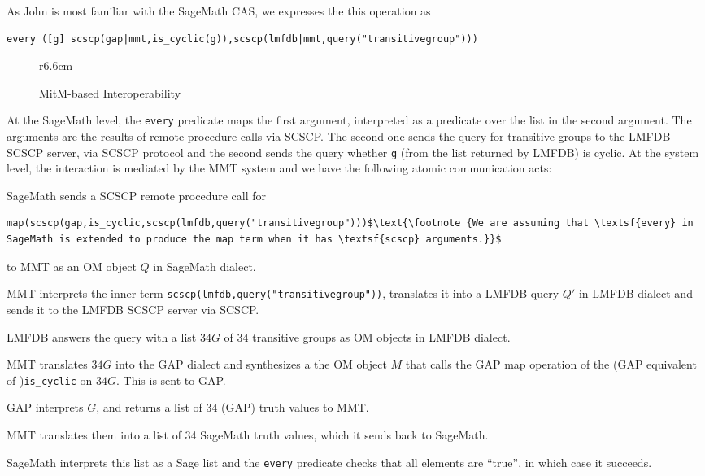 As John is most familiar with the SageMath CAS, we expresses the this operation as 
\begin{lstlisting}
every ([g] scscp(gap|mmt,is_cyclic(g)),scscp(lmfdb|mmt,query("transitivegroup"))) 
\end{lstlisting}

\begin{wrapfigure}r{6.6cm}\vspace*{-2em}
  \vspace*{-1em}
  \caption{MitM-based Interoperability}\label{fig:mitmcomm}\vspace*{-1em}
\end{wrapfigure}
At the SageMath level, the \lstinline|every| predicate maps the first argument, interpreted as a predicate over the list in the second argument. 
The arguments are the results of remote procedure calls via SCSCP. 
The second one sends the query for transitive groups to the LMFDB SCSCP server, via SCSCP protocol and the second sends the query whether \lstinline|g| (from the list returned by LMFDB) is cyclic.
At the system level, the interaction is mediated by the MMT system and we have the following atomic communication acts: 
\begin{compactenum}
\item SageMath sends a SCSCP remote procedure call for 
  \begin{lstlisting}[mathescape]
    map(scscp(gap,is_cyclic,scscp(lmfdb,query("transitivegroup")))$\text{\footnote {We are assuming that \textsf{every} in SageMath is extended to produce the map term when it has \textsf{scscp} arguments.}}$
\end{lstlisting}
  to MMT as an OM object $Q$ in SageMath dialect.  
\item MMT interprets the inner term \lstinline|scscp(lmfdb,query("transitivegroup"))|, translates it into a LMFDB query $Q'$ in LMFDB dialect and sends it to the LMFDB SCSCP server via SCSCP. 
\item LMFDB answers the query with a list $34G$ of 34 transitive groups as OM objects in LMFDB dialect.
\item MMT translates $34G$ into the GAP dialect and synthesizes a the OM object $M$ that calls the GAP map operation of the (GAP equivalent of )\lstinline|is_cyclic| on $34G$. This is sent to GAP. 
\item GAP interprets $G$, and returns a list of 34 (GAP) truth values to MMT. 
\item MMT translates them into a list of 34 SageMath truth values, which it sends back to SageMath. 
\item SageMath interprets this list as a Sage list and the \lstinline|every| predicate checks that all elements are ``true'', in which case it succeeds. 
\end{compactenum}

